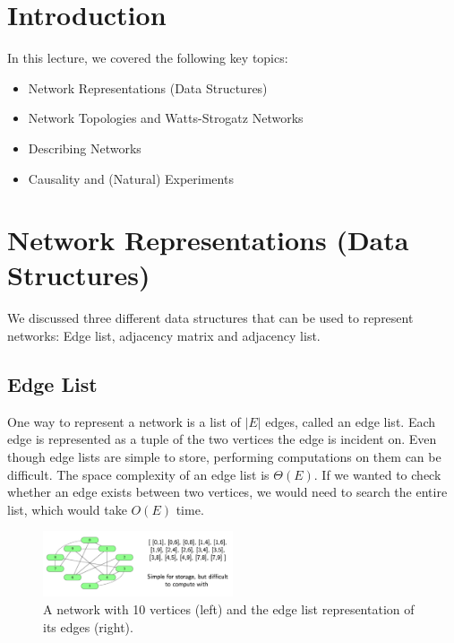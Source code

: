 
\section{Introduction}
In this lecture, we covered the following key topics:
\begin{itemize}
  \item Network Representations (Data Structures)
  \item Network Topologies and Watts-Strogatz Networks
  \item Describing Networks
  \item Causality and (Natural) Experiments
\end{itemize}

\section{Network Representations (Data Structures)}
We discussed three different data structures that can be used to represent networks: Edge list, adjacency matrix and adjacency list.

\subsection{Edge List}
One way to represent a network is a list of $|E|$ edges, called an edge list. Each edge is represented as a tuple of the two vertices the edge is incident on. Even though edge lists are simple to store, performing computations on them can be difficult. The space complexity of an edge list is $\Theta(E)$. If we wanted to check whether an edge exists between two vertices, we would need to search the entire list, which would take $O(E)$ time.

\begin{figure}[ht]
  \begin{center}
    \includegraphics[width=0.5\textwidth]{figures/edge_list.png}
    \caption{
      A network with 10 vertices (left) and the edge list representation of its edges (right).}
    \label{fig:edge_list}
  \end{center}
\end{figure}

